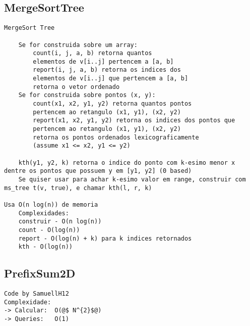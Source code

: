 \subsection{MergeSortTree}
\vspace{-4pt}
\begin{lstlisting}[style=description]
    MergeSort Tree

    Se for construida sobre um array:
    	count(i, j, a, b) retorna quantos
    	elementos de v[i..j] pertencem a [a, b]
    	report(i, j, a, b) retorna os indices dos
    	elementos de v[i..j] que pertencem a [a, b]
    	retorna o vetor ordenado
    Se for construida sobre pontos (x, y):
        count(x1, x2, y1, y2) retorna quantos pontos
        pertencem ao retangulo (x1, y1), (x2, y2)
        report(x1, x2, y1, y2) retorna os indices dos pontos que
        pertencem ao retangulo (x1, y1), (x2, y2)
        retorna os pontos ordenados lexicograficamente
        (assume x1 <= x2, y1 <= y2)

    kth(y1, y2, k) retorna o indice do ponto com k-esimo menor x dentre os pontos que possuem y em [y1, y2] (0 based) 
    Se quiser usar para achar k-esimo valor em range, construir com ms_tree t(v, true), e chamar kth(l, r, k)

Usa O(n log(n)) de memoria
    Complexidades:
    construir - O(n log(n))
    count - O(log(n))
    report - O(log(n) + k) para k indices retornados
    kth - O(log(n))

\end{lstlisting}
\vspace{-5pt}
\raggedbottom
\hrulefill

\vspace{-2pt}
\subsection{PrefixSum2D}
\vspace{-4pt}
\begin{lstlisting}[style=description]
Code by SamuellH12
Complexidade:
-> Calcular:  O(@$ N^{2}$@)
-> Queries:	  O(1)


\end{lstlisting}
\vspace{-5pt}
\raggedbottom
\hrulefill

\vspace{-2pt}
